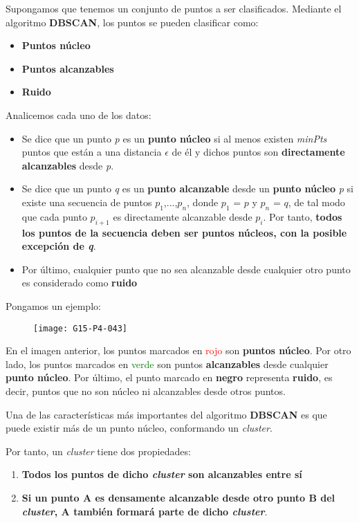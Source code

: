 \documentclass [a4paper] {article}
\begin{document}
Supongamos que tenemos un conjunto de puntos a ser clasificados. Mediante el algoritmo \textbf{DBSCAN}, los puntos se pueden clasificar como:
\begin{itemize}
  \item \textbf{Puntos núcleo}
  \item \textbf{Puntos alcanzables}
  \item \textbf{Ruido}
\end{itemize}
Analicemos cada uno de los datos:
\begin{itemize}
  \item Se dice que un punto \textit{p} es un \textbf{punto núcleo} si al menos existen \textit{minPts} puntos que están a una distancia $\epsilon$ de él y dichos puntos son \textbf{directamente alcanzables} desde \textit{p}.
  \item Se dice que un punto \textit{q} es un \textbf{punto alcanzable} desde un \textbf{punto núcleo} \textit{p} si existe una secuencia de puntos $p_1$,...,$p_n$, donde $p_1$ = $p$ y $p_n$ = $q$, de tal modo que cada punto $p_{i+1}$ es directamente alcanzable desde $p_i$. Por tanto, \textbf{todos los puntos de la secuencia deben ser puntos núcleos, con la posible excepción de \textit{q}}.
  \item Por último, cualquier punto que no sea alcanzable desde cualquier otro punto es considerado como \textbf{ruido}
\end{itemize}
Pongamos un ejemplo:

\begin{figure}[h!]
\centering
\texttt{[image: G15-P4-043]}
\end{figure}
En el imagen anterior, los puntos marcados en \textcolor{red}{rojo} son \textbf{puntos núcleo}. Por otro lado, los puntos marcados en \textcolor{green}{verde} son puntos \textbf{alcanzables} desde cualquier \textbf{punto núcleo}. Por último, el punto marcado en \textbf{negro} representa \textbf{ruido}, es decir, puntos que no son núcleo ni alcanzables desde otros puntos.

Una de las características más importantes del algoritmo \textbf{DBSCAN} es que puede existir más de un punto núcleo, conformando un \textit{cluster}.

Por tanto, un \textit{cluster} tiene dos propiedades:
\begin{enumerate}
  \item \textbf{Todos los puntos de dicho \textit{cluster} son alcanzables entre sí}
  \item \textbf{Si un punto A es densamente alcanzable desde otro punto B del \textit{cluster}, A también formará parte de dicho \textit{cluster}}.
\end{enumerate}
\end{document}
